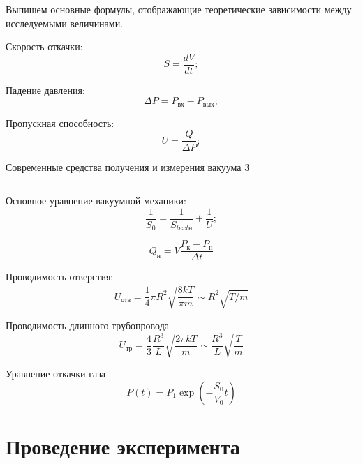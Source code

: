 \documentclass[12pt,a4paper]{scrartcl}
\begin{document}
	Выпишем основные формулы, отображающие теоретические зависимости между исследуемыми величинами.
	
	Скорость откачки:
	\begin{equation}
	S = \frac{dV}{dt};
	\end{equation}	
	
	Падение давления:
	\begin{equation}
	\Delta P = P_{\text{вх}} - P_{\text{вых}};
	\end{equation}
	
	Пропускная способность:
	\begin{equation}
	U = \frac{Q}{\Delta P};
	\end{equation}
	
	
	\newpage
	
	\begin{flushleft}
		\footnotesize{Современные средства получения и измерения вакуума} \hspace{\fill} \footnotesize{3}
		\\[-0.3cm]\noindent\rule{\textwidth}{0.3pt}
	\end{flushleft}
	
	Основное уравнение вакуумной механики:
	\begin{equation}
	\frac{1}{S_{0}} = \frac{1}{S_{text{н}}} + \frac{1}{U};
	\end{equation} 
	
	\begin{equation}
	Q_{\text{н}} = V\frac{P_{\text{к}} - P_{\text{н}}}{\Delta t}		
	\end{equation}
	
	Проводимость отверстия:
	\begin{equation}
	U_{\text{отв}} = \frac{1}{4} \pi R^{2} \sqrt{\frac{8kT}{\pi m}} \sim R^{2}\sqrt{T/m}
	\end{equation}
	
	Проводимость длинного трубопровода
	\begin{equation}
	U_{\text{тр}} = \frac{4}{3} \frac{R^{3}}{L} \sqrt{\frac{2\pi kT}{m}} \sim \frac{R^{3}}{L} \sqrt{\frac{T}{m}} 
	\end{equation}
	
	Уравнение откачки газа
	\begin{equation}
	P\left( t \right) = P_{1}\exp \left(- \frac{S_{0}}{V_{0}}t \right)
	\end{equation}
	
	\section{Проведение эксперимента}
	
\end{document}
